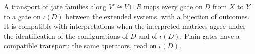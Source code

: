 \begin{definition}
    \label{def:circuits_transport}
    \leanok
    A transport of gate families along $V'\cong V\sqcup R$ maps every gate on $D$
    from $X$ to $Y$ to a gate on $\iota(D)$ between the extended systems, with a
    bijection of outcomes. It is compatible with interpretations when the
    interpreted matrices agree under the identification of the configurations of
    $D$ and of $\iota(D)$. Plain gates have a compatible transport: the same
    operators, read on $\iota(D)$.
\end{definition}


